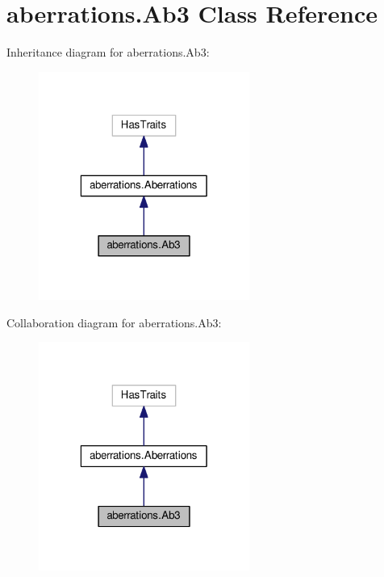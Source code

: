 \hypertarget{classaberrations_1_1_ab3}{\section{aberrations.\-Ab3 Class Reference}
\label{classaberrations_1_1_ab3}
}


Inheritance diagram for aberrations.\-Ab3\-:
\nopagebreak
\begin{figure}[H]
\begin{center}
\leavevmode
\includegraphics[width=196pt]{classaberrations_1_1_ab3__inherit__graph}
\end{center}
\end{figure}


Collaboration diagram for aberrations.\-Ab3\-:
\nopagebreak
\begin{figure}[H]
\begin{center}
\leavevmode
\includegraphics[width=196pt]{classaberrations_1_1_ab3__coll__graph}
\end{center}
\end{figure}
